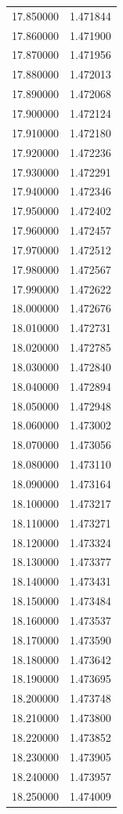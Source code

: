 \begin{tabular}{rr}
17.850000 & 1.471844 \\
17.860000 & 1.471900 \\
17.870000 & 1.471956 \\
17.880000 & 1.472013 \\
17.890000 & 1.472068 \\
17.900000 & 1.472124 \\
17.910000 & 1.472180 \\
17.920000 & 1.472236 \\
17.930000 & 1.472291 \\
17.940000 & 1.472346 \\
17.950000 & 1.472402 \\
17.960000 & 1.472457 \\
17.970000 & 1.472512 \\
17.980000 & 1.472567 \\
17.990000 & 1.472622 \\
18.000000 & 1.472676 \\
18.010000 & 1.472731 \\
18.020000 & 1.472785 \\
18.030000 & 1.472840 \\
18.040000 & 1.472894 \\
18.050000 & 1.472948 \\
18.060000 & 1.473002 \\
18.070000 & 1.473056 \\
18.080000 & 1.473110 \\
18.090000 & 1.473164 \\
18.100000 & 1.473217 \\
18.110000 & 1.473271 \\
18.120000 & 1.473324 \\
18.130000 & 1.473377 \\
18.140000 & 1.473431 \\
18.150000 & 1.473484 \\
18.160000 & 1.473537 \\
18.170000 & 1.473590 \\
18.180000 & 1.473642 \\
18.190000 & 1.473695 \\
18.200000 & 1.473748 \\
18.210000 & 1.473800 \\
18.220000 & 1.473852 \\
18.230000 & 1.473905 \\
18.240000 & 1.473957 \\
18.250000 & 1.474009 \\

\end{tabular}
